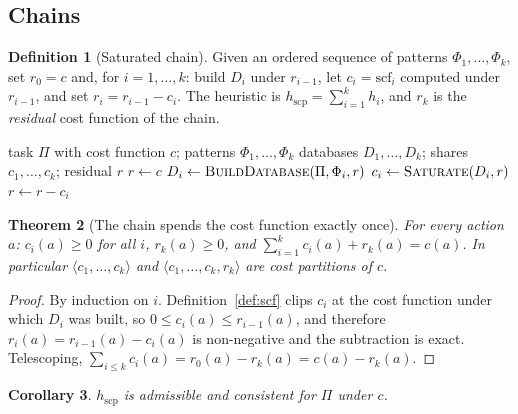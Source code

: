 \documentclass[10pt,twocolumn,a4paper]{article}
\theoremstyle{plain}
\newtheorem{theorem}{Theorem}
\newtheorem{corollary}[theorem]{Corollary}
\theoremstyle{definition}
\newtheorem{definition}[theorem]{Definition}
\theoremstyle{remark}
\newcommand{\Task}{\Pi}
\newcommand{\scf}{\mathrm{scf}}
\begin{document}
\subsection{Chains}

\begin{definition}[Saturated chain]
\label{def:chain}
Given an ordered sequence of patterns $\Phi_1, \dots, \Phi_k$, set $r_0 = c$
and, for $i = 1, \dots, k$: build $D_i$ under $r_{i-1}$, let $c_i = \scf_i$
computed under $r_{i-1}$, and set $r_i = r_{i-1} - c_i$. The heuristic is
$h_{\mathrm{scp}} = \sum_{i=1}^{k} h_i$, and $r_k$ is the \emph{residual} cost
function of the chain.
\end{definition}

\begin{algorithm}[t]
\caption{Saturated chain over an ordered pattern sequence}
\label{alg:chain}
\begin{algorithmic}[1]
\Require task $\Task$ with cost function $c$; patterns $\Phi_1, \dots, \Phi_k$
\Ensure databases $D_1, \dots, D_k$; shares $c_1, \dots, c_k$; residual $r$
\State $r \gets c$
  \State $D_i \gets \textsc{BuildDatabase}(\Task, \Phi_i, r)$
  \State $c_i \gets \textsc{Saturate}(D_i, r)$
  \State $r \gets r - c_i$
\EndFor
\end{algorithmic}
\end{algorithm}

\begin{theorem}[The chain spends the cost function exactly once]
\label{thm:chain}
For every action $a$: $c_i(a) \ge 0$ for all $i$, $r_k(a) \ge 0$, and
$\sum_{i=1}^{k} c_i(a) + r_k(a) = c(a)$. In particular
$\langle c_1, \dots, c_k \rangle$ and $\langle c_1, \dots, c_k, r_k \rangle$
are cost partitions of $c$.
\end{theorem}

\begin{proof}
By induction on $i$. Definition~\ref{def:scf} clips $c_i$ at the cost function
under which $D_i$ was built, so $0 \le c_i(a) \le r_{i-1}(a)$, and therefore
$r_i(a) = r_{i-1}(a) - c_i(a)$ is non-negative and the subtraction is exact.
Telescoping, $\sum_{i \le k} c_i(a) = r_0(a) - r_k(a) = c(a) - r_k(a)$.
\end{proof}

\begin{corollary}
\label{cor:chain-admissible}
$h_{\mathrm{scp}}$ is admissible and consistent for $\Task$ under $c$.
\end{corollary}
\end{document}
